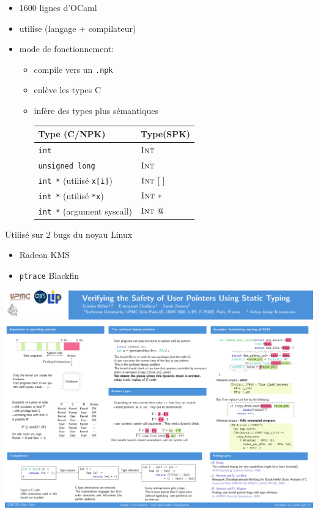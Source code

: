 \documentclass{beamer}
\begin{document}
\begin{frame}

\begin{itemize}
\item 1600 lignes d'OCaml
\item utilise \newspeak (langage + compilateur)
\item mode de fonctionnement:
  \begin{itemize}
  \item compile vers un \texttt{.npk}
  \item enlève les types C
  \item infère des types plus sémantiques

      \begin{tabular}{ll}
          \toprule
          Type (C/NPK) & Type(SPK) \\
          \midrule
          \texttt{int} & $\textsc{Int}$ \\
          \texttt{unsigned long} & $\textsc{Int}$ \\
          \texttt{int *} (utilisé \texttt{x[i]}) & $\textsc{Int}~[~]$ \\
          \texttt{int *} (utilisé \texttt{*x}) & $\textsc{Int}~*$ \\
          \texttt{int *} (argument syscall) & $\textsc{Int}~@$ \\
          \bottomrule
      \end{tabular}
  \end{itemize}
\end{itemize}

\end{frame}

\begin{frame}
    Utilisé sur 2 bugs du noyau Linux

    \begin{itemize}
        \item Radeon KMS
        \item \texttt{ptrace} Blackfin
    \end{itemize}
\end{frame}

\begin{frame}
    \includegraphics[trim=2300 1430 100 500,clip,width=\textwidth]{poster.pdf}
\end{frame}
\end{document}
